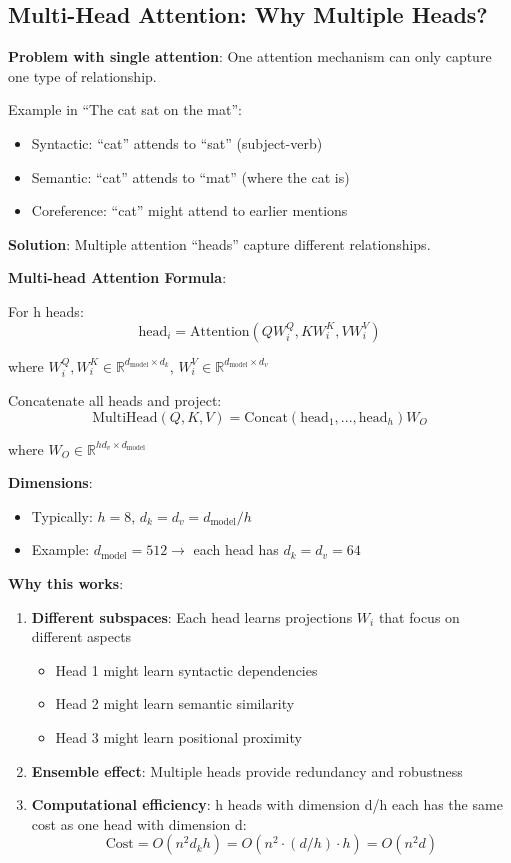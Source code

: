 \documentclass[11pt,oneside]{book}
\begin{document}
\subsection{Multi-Head Attention: Why Multiple Heads?}

\textbf{Problem with single attention}: One attention mechanism can only capture one type of relationship.

Example in ``The cat sat on the mat'':
\begin{itemize}
\item Syntactic: ``cat'' attends to ``sat'' (subject-verb)
\item Semantic: ``cat'' attends to ``mat'' (where the cat is)
\item Coreference: ``cat'' might attend to earlier mentions
\end{itemize}

\textbf{Solution}: Multiple attention ``heads'' capture different relationships.

\textbf{Multi-head Attention Formula}:

For h heads:
\[
\text{head}_i = \text{Attention}(QW_i^Q, KW_i^K, VW_i^V)
\]

where $W_i^Q, W_i^K \in \mathbb{R}^{d_{\text{model}} \times d_k}$, $W_i^V \in \mathbb{R}^{d_{\text{model}} \times d_v}$

Concatenate all heads and project:
\[
\text{MultiHead}(Q, K, V) = \text{Concat}(\text{head}_1, ..., \text{head}_h) W_O
\]

where $W_O \in \mathbb{R}^{hd_v \times d_{\text{model}}}$

\textbf{Dimensions}:
\begin{itemize}
\item Typically: $h = 8$, $d_k = d_v = d_{\text{model}} / h$
\item Example: $d_{\text{model}} = 512 \to$ each head has $d_k = d_v = 64$
\end{itemize}

\textbf{Why this works}:

\begin{enumerate}
\item \textbf{Different subspaces}: Each head learns projections $W_i$ that focus on different aspects
\begin{itemize}
\item Head 1 might learn syntactic dependencies
\item Head 2 might learn semantic similarity
\item Head 3 might learn positional proximity
\end{itemize}

\item \textbf{Ensemble effect}: Multiple heads provide redundancy and robustness

\item \textbf{Computational efficiency}: h heads with dimension d/h each has the same cost as one head with dimension d:
\[
\text{Cost} = O(n^2 d_k h) = O(n^2 \cdot (d/h) \cdot h) = O(n^2 d)
\]
\end{enumerate}
\end{document}
